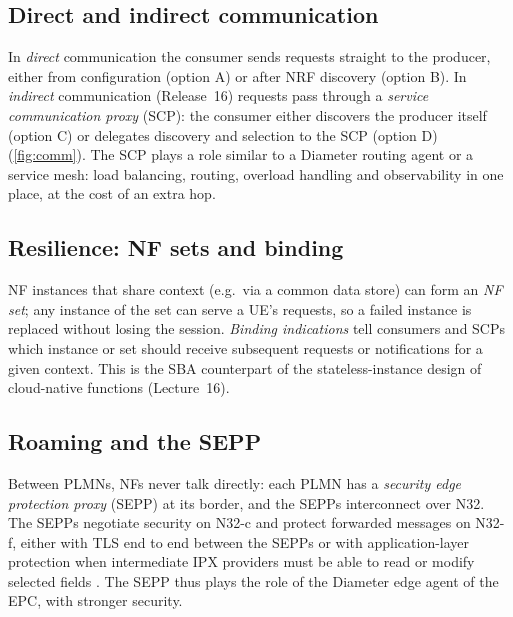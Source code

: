 \documentclass[11pt,a4paper]{article}
\begin{document}
\subsection{Direct and indirect communication}
In \emph{direct} communication the consumer sends requests straight to the producer, either from configuration (option A)
or after NRF discovery (option B). In \emph{indirect} communication (Release~16) requests pass through a \emph{service
communication proxy} (SCP): the consumer either discovers the producer itself (option C) or delegates discovery and selection
to the SCP (option D) (\cref{fig:comm}). The SCP plays a role similar to a Diameter routing agent or a service mesh: load
balancing, routing, overload handling and observability in one place, at the cost of an extra hop.

\begin{acnfigure}
  \caption{Direct communication (options A/B) and indirect communication via an SCP (options C/D).}
  \label{fig:comm}
\end{acnfigure}

\subsection{Resilience: NF sets and binding}
NF instances that share context (e.g.\ via a common data store) can form an \emph{NF set}; any instance of the set can serve
a UE's requests, so a failed instance is replaced without losing the session. \emph{Binding indications} tell consumers and
SCPs which instance or set should receive subsequent requests or notifications for a given context. This is the SBA
counterpart of the stateless-instance design of cloud-native functions (Lecture~16).

\subsection{Roaming and the SEPP}
Between PLMNs, NFs never talk directly: each PLMN has a \emph{security edge protection proxy} (SEPP) at its border, and the
SEPPs interconnect over N32. The SEPPs negotiate security on N32-c and protect forwarded messages on N32-f, either with TLS
end to end between the SEPPs or with application-layer protection when intermediate IPX providers must be able to read or
modify selected fields \cite{ts33501}. The SEPP thus plays the role of the Diameter edge agent of the EPC, with stronger
security.
\end{document}

